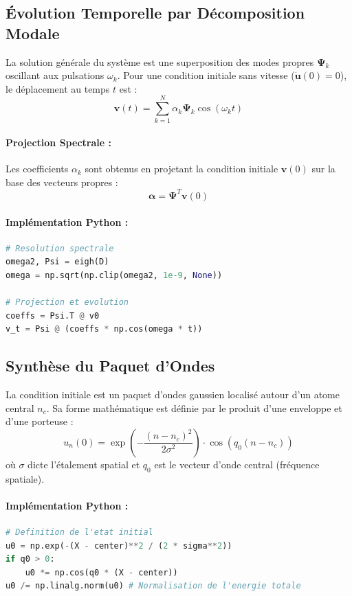 \documentclass[11pt, a4paper]{report}
\begin{document}
\subsection{Évolution Temporelle par Décomposition Modale}

La solution générale du système est une superposition des modes propres $\mathbf{\Psi}_k$ oscillant aux pulsations $\omega_k$. Pour une condition initiale sans vitesse ($\mathbf{\dot{u}}(0) = 0$), le déplacement au temps $t$ est :
\begin{equation}
    \mathbf{v}(t) = \sum_{k=1}^N \alpha_k \mathbf{\Psi}_k \cos(\omega_k t)
\end{equation}

\paragraph{Projection Spectrale :}
Les coefficients $\alpha_k$ sont obtenus en projetant la condition initiale $\mathbf{v}(0)$ sur la base des vecteurs propres :
\begin{equation}
    \boldsymbol{\alpha} = \mathbf{\Psi}^T \mathbf{v}(0)
\end{equation}

\paragraph{Implémentation Python :}
\begin{lstlisting}[language=Python]
# Resolution spectrale
omega2, Psi = eigh(D)
omega = np.sqrt(np.clip(omega2, 1e-9, None))

# Projection et evolution
coeffs = Psi.T @ v0
v_t = Psi @ (coeffs * np.cos(omega * t))
\end{lstlisting}

\subsection{Synthèse du Paquet d'Ondes}

La condition initiale est un paquet d'ondes gaussien localisé autour d'un atome central $n_c$. Sa forme mathématique est définie par le produit d'une enveloppe et d'une porteuse :
\begin{equation}
    u_n(0) = \exp\left( -\frac{(n-n_c)^2}{2\sigma^2} \right) \cdot \cos(q_0 (n-n_c))
\end{equation}
où $\sigma$ dicte l'étalement spatial et $q_0$ est le vecteur d'onde central (fréquence spatiale).

\paragraph{Implémentation Python :}
\begin{lstlisting}[language=Python]
# Definition de l'etat initial
u0 = np.exp(-(X - center)**2 / (2 * sigma**2))
if q0 > 0:
    u0 *= np.cos(q0 * (X - center))
u0 /= np.linalg.norm(u0) # Normalisation de l'energie totale
\end{lstlisting}
\end{document}

